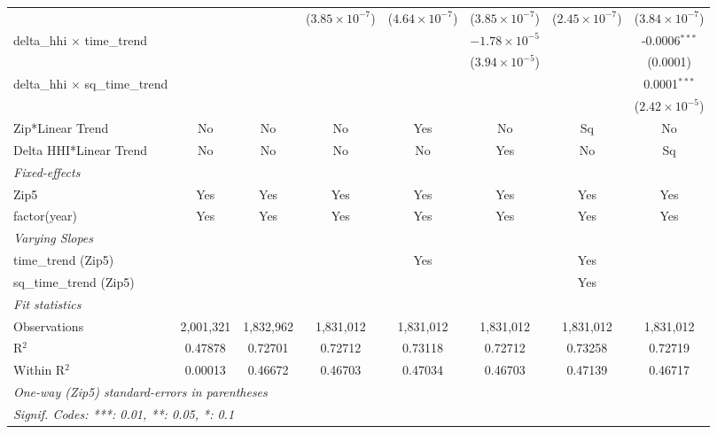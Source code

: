 \begin{table}[H]
{\begin{tabular}{lccccccc}
   &   &    & ($3.85\times 10^{-7}$) & ($4.64\times 10^{-7}$) & ($3.85\times 10^{-7}$) & ($2.45\times 10^{-7}$) & ($3.84\times 10^{-7}$)\\ 

 delta\_hhi $\times $ time\_trend&   &    &    &    & $-1.78\times 10^{-5}$ &    & -0.0006$^{***}$\\ 

   &   &    &    &    & ($3.94\times 10^{-5}$) &    & (0.0001)\\ 

 delta\_hhi $\times $ sq\_time\_trend&   &    &    &    &    &    & 0.0001$^{***}$\\ 

   &   &    &    &    &    &    & ($2.42\times 10^{-5}$)\\ 

 Zip*Linear Trend & No & No & No & Yes & No & Sq & No\\ 

 Delta HHI*Linear Trend & No & No & No & No & Yes & No & Sq\\ 

 \midrule \emph{Fixed-effects}&   &   &   &   &   &   &  \\ 

 Zip5 & Yes & Yes & Yes & Yes & Yes & Yes & Yes\\ 

 factor(year) & Yes & Yes & Yes & Yes & Yes & Yes & Yes\\ 

 \midrule \emph{Varying Slopes}&   &   &   &   &   &   &  \\ 

 time\_trend (Zip5) &  &  &  & Yes &  & Yes & \\ 

 sq\_time\_trend (Zip5) &  &  &  &  &  & Yes & \\ 

 \midrule \emph{Fit statistics}&  & & & & & & \\ 

 Observations & 2,001,321&1,832,962&1,831,012&1,831,012&1,831,012&1,831,012&1,831,012\\ 

 R$^2$ & 0.47878&0.72701&0.72712&0.73118&0.72712&0.73258&0.72719\\ 

 Within R$^2$ & 0.00013&0.46672&0.46703&0.47034&0.46703&0.47139&0.46717\\ 

 \midrule\midrule\multicolumn{8}{l}{\emph{One-way (Zip5) standard-errors in parentheses}}\\ 

 \multicolumn{8}{l}{\emph{Signif. Codes: ***: 0.01, **: 0.05, *: 0.1}}\\ 

 \end{tabular}} 

 \end{table} 

